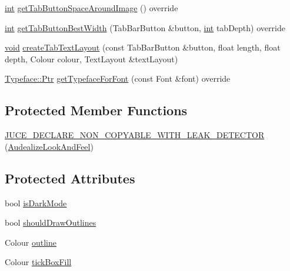\begin{DoxyCompactItemize}
\item 
\hyperlink{tk_8h_a83f82f76e7fed06f4c49d2db94028a6d}{int} \hyperlink{class_audealize_1_1_audealize_look_and_feel_a065a60ac311f37f2961e1a730002f286}{get\+Tab\+Button\+Space\+Around\+Image} () override
\item 
\hyperlink{tk_8h_a83f82f76e7fed06f4c49d2db94028a6d}{int} \hyperlink{class_audealize_1_1_audealize_look_and_feel_a07ad47fae31adfbba2da2c32ce1d9a2f}{get\+Tab\+Button\+Best\+Width} (Tab\+Bar\+Button \&button, \hyperlink{tk_8h_a83f82f76e7fed06f4c49d2db94028a6d}{int} tab\+Depth) override
\item 
\hyperlink{tk_8h_aba408b7cd755a96426e004c015f5de8e}{void} \hyperlink{class_audealize_1_1_audealize_look_and_feel_a40911e2845c867d1cae029381fb3e549}{create\+Tab\+Text\+Layout} (const Tab\+Bar\+Button \&button, float length, float depth, Colour colour, Text\+Layout \&text\+Layout)
\item 
\hyperlink{wngrind_8h_a5a194e58b8cdf07d26c5155458b894e5}{Typeface\+::\+Ptr} \hyperlink{class_audealize_1_1_audealize_look_and_feel_ab4c1fd338f94c2805ff2cd2c74693340}{get\+Typeface\+For\+Font} (const Font \&font) override
\end{DoxyCompactItemize}
\subsection*{Protected Member Functions}
\begin{DoxyCompactItemize}
\item 
\hyperlink{class_audealize_1_1_audealize_look_and_feel_a13d4fd771a8b1b529d40d16638dff301}{J\+U\+C\+E\+\_\+\+D\+E\+C\+L\+A\+R\+E\+\_\+\+N\+O\+N\+\_\+\+C\+O\+P\+Y\+A\+B\+L\+E\+\_\+\+W\+I\+T\+H\+\_\+\+L\+E\+A\+K\+\_\+\+D\+E\+T\+E\+C\+T\+OR} (\hyperlink{class_audealize_1_1_audealize_look_and_feel}{Audealize\+Look\+And\+Feel})
\end{DoxyCompactItemize}
\subsection*{Protected Attributes}
\begin{DoxyCompactItemize}
\item 
bool \hyperlink{class_audealize_1_1_audealize_look_and_feel_abf69c4abd23d537b60d64affb4043239}{is\+Dark\+Mode}
\item 
bool \hyperlink{class_audealize_1_1_audealize_look_and_feel_a07cd4432ef608356358e0cf9bc7c023d}{should\+Draw\+Outlines}
\item 
Colour \hyperlink{class_audealize_1_1_audealize_look_and_feel_a58cf84e200bd9f7b6f8677c82245d9b9}{outline}
\item 
Colour \hyperlink{class_audealize_1_1_audealize_look_and_feel_aaf004191d1a34a05f02bf31a24bc2865}{tick\+Box\+Fill}
\end{DoxyCompactItemize}


